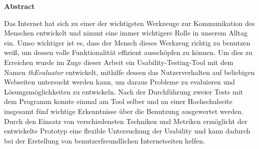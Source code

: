 \vspace*{2cm}

\begin{center}
    \textbf{Abstract}
\end{center}

\vspace*{1cm}

\noindent Das Internet hat sich zu einer der wichtigsten Werkzeuge zur Kommunikation des Menschen entwickelt und nimmt eine immer wichtigere Rolle in unserem Alltag ein. Umso wichtiger ist es, dass der Mensch dieses Werkzeug richtig zu benutzen weiß, um dessen volle Funktionalität effizient ausschöpfen zu können. Um dies zu Erreichen wurde im Zuge dieser Arbeit ein Usability-Testing-Tool mit dem Namen \textit{thEvaluator} entwickelt, mithilfe dessen das Nutzerverhalten auf beliebigen Webseiten untersucht werden kann, um daraus Probleme zu evaluieren und Lösungsmöglichkeiten zu entwickeln. Nach der Durchführung zweier Tests mit dem Programm konnte einmal am Tool selber und an einer Hochschulseite insgesamt fünf wichtige Erkenntnisse über die Benutzung ausgewertet werden. Durch den Einsatz von verschiedensten Techniken und Metriken ermöglicht der entwickelte Prototyp eine flexible Untersuchung der Usability und kann dadurch bei der Erstellung von benutzerfreundlichen Internetseiten helfen.
